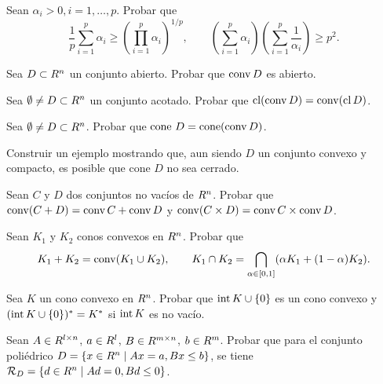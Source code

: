\begin{exercise}\label{v1:ejer:3.2.2}
 Sean $\alpha_i > 0, i = 1, \dots, p$. Probar que
 \[
 \frac{1}{p} \sum_{i=1}^p \alpha_i \ge \left( \prod_{i=1}^p \alpha_i \right)^{1/p}, \qquad \left( \sum_{i=1}^p \alpha_i \right) \left( \sum_{i=1}^p \frac{1}{\alpha_i} \right) \ge p^2.
 \]
\end{exercise}

\begin{exercise}\label{v1:ejer:3.2.3}
 Sea $D \subset R^n$ un conjunto abierto. Probar que $\operatorname{conv} D$ es abierto.
\end{exercise}

\begin{exercise}\label{v1:ejer:3.2.4}
 Sea $\emptyset \neq D \subset R^n$ un conjunto acotado. Probar que $\operatorname{cl}(\operatorname{conv} D) = \operatorname{conv}(\operatorname{cl} D)$.
\end{exercise}

\begin{exercise}\label{v1:ejer:3.2.5}
 Sea $\emptyset \neq D \subset R^n$. Probar que $\text{cone } D = \text{cone}(\operatorname{conv} D)$.
\end{exercise}

\begin{exercise}\label{v1:ejer:3.2.6}
 Construir un ejemplo mostrando que, aun siendo $D$ un conjunto convexo y compacto, es posible que $\text{cone } D$ no sea cerrado.
\end{exercise}

\begin{exercise}\label{v1:ejer:3.2.7}
 Sean $C$ y $D$ dos conjuntos no vacíos de $R^n$. Probar que $\operatorname{conv}(C + D) = \operatorname{conv} C + \operatorname{conv} D$ y $\operatorname{conv}(C \times D) = \operatorname{conv} C \times \operatorname{conv} D$.
\end{exercise}

\begin{exercise}\label{v1:ejer:3.2.8}
 Sean $K_1$ y $K_2$ conos convexos en $R^n$. Probar que
 \[
 K_1 + K_2 = \operatorname{conv}(K_1 \cup K_2), \qquad K_1 \cap K_2 = \bigcap_{\alpha \in [0,1]} (\alpha K_1 + (1 - \alpha)K_2).
 \]
\end{exercise}

\begin{exercise}\label{v1:ejer:3.2.9}
 Sea $K$ un cono convexo en $R^n$. Probar que $\operatorname{\operatorname{int}} K \cup \{0\}$ es un cono convexo y $(\operatorname{\operatorname{int}} K \cup \{0\})^* = K^*$ si $\operatorname{\operatorname{int}} K$ es no vacío.
\end{exercise}

\begin{exercise}\label{v1:ejer:3.2.10}
 Sean $A \in R^{l \times n}$, $a \in R^l$, $B \in R^{m \times n}$, $b \in R^m$. Probar que para el conjunto poliédrico $D = \{ x \in R^n \mid Ax = a, Bx \le b \}$, se tiene $\mathcal{R}_D = \{ d \in R^n \mid Ad = 0, Bd \le 0 \}$.
\end{exercise}

